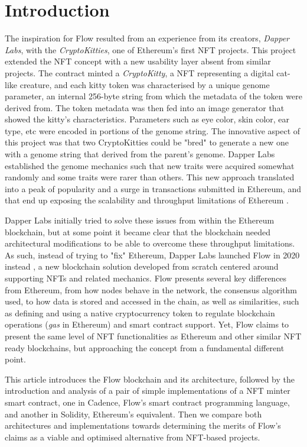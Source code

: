 \documentclass[../NFTComp_IEEE.tex]{subfiles}
\begin{document}
\section{Introduction}
\label{sec:introduction}
The inspiration for Flow resulted from an experience from its creators, \textit{Dapper Labs}, with the \textit{CryptoKitties}, one of Ethereum's first NFT projects. This project extended the NFT concept with a new usability layer absent from similar projects. The contract minted a \textit{CryptoKitty}, a NFT representing a digital cat-like creature, and each kitty token was characterised by a unique genome parameter, an internal 256-byte string from which the metadata of the token were derived from. The token metadata was then fed into an image generator that showed the kitty's characteristics. Parameters such as eye color, skin color, ear type, etc were encoded in portions of the genome string. The innovative aspect of this project was that two CryptoKitties could be "bred" to generate a new one with a genome string that derived from the parent's genome. Dapper Labs established the genome mechanics such that new traits were acquired somewhat randomly and some traits were rarer than others. This new approach translated into a peak of popularity and a surge in transactions submitted in Ethereum, and that end up exposing the scalability and throughput limitations of Ethereum \cite{bbc2017}.
\par
Dapper Labs initially tried to solve these issues from within the Ethereum blockchain, but at some point it became clear that the blockchain needed architectural modifications to be able to overcome these throughput limitations. As such, instead of trying to "fix" Ethereum, Dapper Labs launched Flow in 2020 instead \cite{Gharegozlou2019}, a new blockchain solution developed from scratch centered around supporting NFTs and related mechanics. Flow presents several key differences from Ethereum, from how nodes behave in the network, the consensus algorithm used, to how data is stored and accessed in the chain, as well as similarities, such as defining and using a native cryptocurrency token to regulate blockchain operations (\textit{gas} in Ethereum) and smart contract support. Yet, Flow claims to present the same level of NFT functionalities as Ethereum and other similar NFT ready blockchains, but approaching the concept from a fundamental different point.
\par
This article introduces the Flow blockchain and its architecture, followed by the introduction and analysis of a pair of simple implementations of a NFT minter smart contract, one in Cadence, Flow's smart contract programming language, and another in Solidity, Ethereum's equivalent. Then we compare both architectures and implementations towards determining the merits of Flow's claims as a viable and optimised alternative from NFT-based projects.
\end{document}
